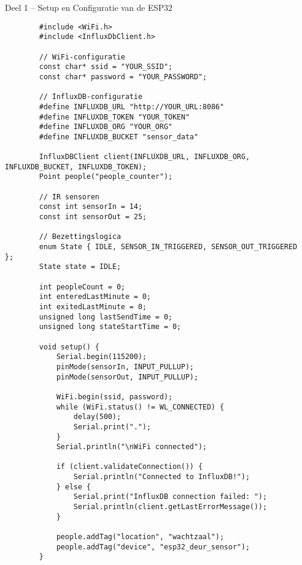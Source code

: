 \documentclass[dutch,dit,thesis]{hogentreport}
\begin{document}
   
\begin{listing}[H]
    \caption{Deel 1 – Setup en Configuratie van de ESP32}
    \label{lst:esp32_setup}
    \begin{verbatim}
        #include <WiFi.h>
        #include <InfluxDbClient.h>
        
        // WiFi-configuratie
        const char* ssid = "YOUR_SSID";
        const char* password = "YOUR_PASSWORD";
        
        // InfluxDB-configuratie
        #define INFLUXDB_URL "http://YOUR_URL:8086"
        #define INFLUXDB_TOKEN "YOUR_TOKEN"
        #define INFLUXDB_ORG "YOUR_ORG"
        #define INFLUXDB_BUCKET "sensor_data"
        
        InfluxDBClient client(INFLUXDB_URL, INFLUXDB_ORG, INFLUXDB_BUCKET, INFLUXDB_TOKEN);
        Point people("people_counter");
        
        // IR sensoren
        const int sensorIn = 14;
        const int sensorOut = 25;
        
        // Bezettingslogica
        enum State { IDLE, SENSOR_IN_TRIGGERED, SENSOR_OUT_TRIGGERED };
        State state = IDLE;
        
        int peopleCount = 0;
        int enteredLastMinute = 0;
        int exitedLastMinute = 0;
        unsigned long lastSendTime = 0;
        unsigned long stateStartTime = 0;
        
        void setup() {
            Serial.begin(115200);
            pinMode(sensorIn, INPUT_PULLUP);
            pinMode(sensorOut, INPUT_PULLUP);
            
            WiFi.begin(ssid, password);
            while (WiFi.status() != WL_CONNECTED) {
                delay(500);
                Serial.print(".");
            }
            Serial.println("\nWiFi connected");
            
            if (client.validateConnection()) {
                Serial.println("Connected to InfluxDB!");
            } else {
                Serial.print("InfluxDB connection failed: ");
                Serial.println(client.getLastErrorMessage());
            }
            
            people.addTag("location", "wachtzaal");
            people.addTag("device", "esp32_deur_sensor");
        }
    \end{verbatim}
\end{listing}
\end{document}
